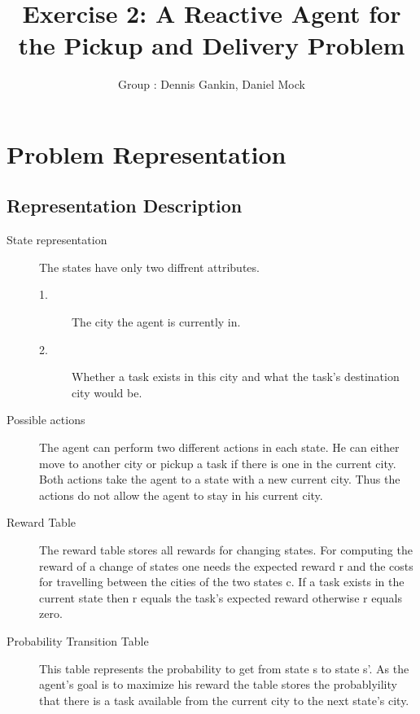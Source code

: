 \documentclass[11pt]{article}
\title{\bf Exercise 2: A Reactive Agent for the Pickup and Delivery Problem}
\author{Group \textnumero 29: Dennis Gankin, Daniel Mock}
\begin{document}
\maketitle

\section{Problem Representation}

\subsection{Representation Description}
\begin{description}
	\item [State representation] The states have only two diffrent attributes.
		\begin{description}
			\item[1.] The city the agent is currently in.
			\item[2.] Whether a task exists in this city and what the task's destination city would be.
		\end{description}
	\item [Possible actions] The agent can perform two different actions in each state. He can either move to another city or pickup a task if there is one in the current city. Both actions take the agent to a state with a new current city. Thus the actions do not allow the agent to stay in his current city.
	\item[Reward Table] The reward table stores all rewards for changing states. For computing the reward of a change of states one needs the expected reward r and the costs for travelling between the cities of the two states c. If a task exists in the current state then r equals the task's expected reward otherwise r equals zero.
	\item[Probability Transition Table] This table represents the probability to get from state s to state s'. As the agent's goal is to maximize his reward the table stores the probablyility that there is a task available from the current city to the next state's city.  
\end{description}
\end{document}
